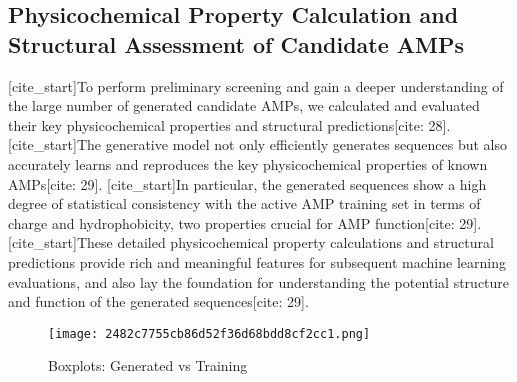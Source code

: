 \documentclass{article}
\begin{document}
\subsection{Physicochemical Property Calculation and Structural Assessment of Candidate AMPs}
[cite_start]To perform preliminary screening and gain a deeper understanding of the large number of generated candidate AMPs, we calculated and evaluated their key physicochemical properties and structural predictions[cite: 28]. [cite_start]The generative model not only efficiently generates sequences but also accurately learns and reproduces the key physicochemical properties of known AMPs[cite: 29]. [cite_start]In particular, the generated sequences show a high degree of statistical consistency with the active AMP training set in terms of charge and hydrophobicity, two properties crucial for AMP function[cite: 29]. [cite_start]These detailed physicochemical property calculations and structural predictions provide rich and meaningful features for subsequent machine learning evaluations, and also lay the foundation for understanding the potential structure and function of the generated sequences[cite: 29].

\begin{figure}[htbp]
    \centering
    \texttt{[image: 2482c7755cb86d52f36d68bdd8cf2cc1.png]} %
    \caption{Boxplots: Generated vs Training}
\end{figure}
\end{document}
